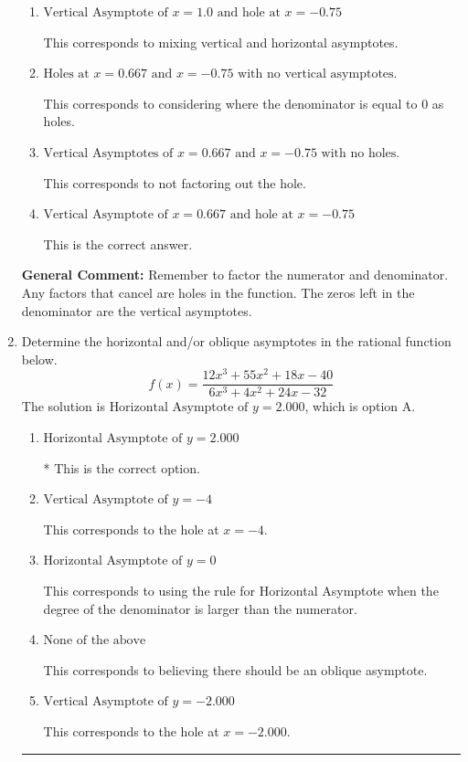 \documentclass{extbook}[14pt]
\newcommand{\litem}[1]{\item #1

\rule{\textwidth}{0.4pt}}
\begin{document}
\begin{enumerate}
{\begin{enumerate}[label=\Alph*.]
This corresponds to setting the numerator equal to 0.
\item \( \text{Vertical Asymptote of } x = 1.0 \text{ and hole at } x = -0.75 \)

This corresponds to mixing vertical and horizontal asymptotes.
\item \( \text{Holes at } x = 0.667 \text{ and } x = -0.75 \text{ with no vertical asymptotes.} \)

This corresponds to considering where the denominator is equal to 0 as holes.
\item \( \text{Vertical Asymptotes of } x = 0.667 \text{ and } x = -0.75 \text{ with no holes.} \)

This corresponds to not factoring out the hole.
\item \( \text{Vertical Asymptote of } x = 0.667 \text{ and hole at } x = -0.75 \)

This is the correct answer.
\end{enumerate}

\textbf{General Comment:} Remember to factor the numerator and denominator. Any factors that cancel are holes in the function. The zeros left in the denominator are the vertical asymptotes.
}
\litem{
Determine the horizontal and/or oblique asymptotes in the rational function below.
\[ f(x) = \frac{12x^{3} +55 x^{2} +18 x -40}{6x^{3} +4 x^{2} +24 x -32} \]The solution is \( \text{Horizontal Asymptote of } y = 2.000  \), which is option A.\begin{enumerate}[label=\Alph*.]
\item \( \text{Horizontal Asymptote of } y = 2.000  \)

* This is the correct option.
\item \( \text{Vertical Asymptote of } y = -4  \)

This corresponds to the hole at $x = -4$.
\item \( \text{Horizontal Asymptote of } y = 0  \)

This corresponds to using the rule for Horizontal Asymptote when the degree of the denominator is larger than the numerator.
\item \( \text{None of the above} \)

This corresponds to believing there should be an oblique asymptote.
\item \( \text{Vertical Asymptote of } y = -2.000  \)

This corresponds to the hole at $x = -2.000$.
\end{enumerate}

}
\end{enumerate}
\end{document}
